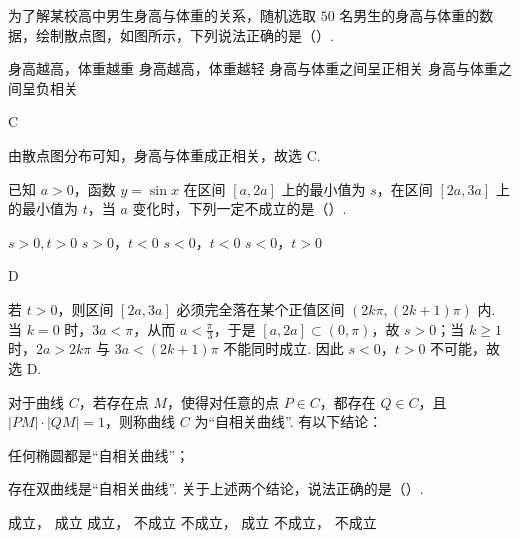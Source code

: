 \begin{problem}
为了解某校高中男生身高与体重的关系，随机选取 \(50\) 名男生的身高与体重的数据，绘制散点图，如图所示，下列说法正确的是（\quad）.


\choices
    {身高越高，体重越重}
    {身高越高，体重越轻}
    {身高与体重之间呈正相关}
    {身高与体重之间呈负相关}
\end{problem}

\begin{answer}
C
\end{answer}

\begin{solution}
由散点图分布可知，身高与体重成正相关，故选 C.
\end{solution}

\begin{problem}
已知 \(a>0\)，函数 \(y=\sin x\) 在区间 \(\left[a,2a\right]\) 上的最小值为 \(s\)，在区间 \(\left[2a,3a\right]\) 上的最小值为 \(t\)，当 \(a\) 变化时，下列一定不成立的是（\quad）.

\choices
    {\(s>0,t>0\)}
    {\(s>0\)，\(t<0\)}
    {\(s<0\)，\(t<0\)}
    {\(s<0\)，\(t>0\)}
\end{problem}

\begin{answer}
D
\end{answer}

\begin{solution}
若 \(t>0\)，则区间 \(\left[2a,3a\right]\) 必须完全落在某个正值区间 \(\left(2k\pi,(2k+1)\pi\right)\) 内.
当 \(k=0\) 时，\(3a<\pi\)，从而 \(a<\frac{\pi}{3}\)，于是 \(\left[a,2a\right]\subset(0,\pi)\)，故 \(s>0\)；当 \(k\ge 1\) 时，\(2a>2k\pi\) 与 \(3a<(2k+1)\pi\) 不能同时成立.
因此 \(s<0\)，\(t>0\) 不可能，故选 D.
\end{solution}

\begin{problem}
对于曲线 \(C\)，若存在点 \(M\)，使得对任意的点 \(P\in C\)，都存在 \(Q\in C\)，且 \(\left|PM\right|\cdot\left|QM\right|=1\)，则称曲线 \(C\) 为“自相关曲线”. 有以下结论：
\begin{circlelist}
\item 任何椭圆都是“自相关曲线”；
\item 存在双曲线是“自相关曲线”. 关于上述两个结论，说法正确的是（\quad）.
\end{circlelist}

\choices
    { 成立， 成立}
    { 成立， 不成立}
    { 不成立， 成立}
    { 不成立， 不成立}
\end{problem}

